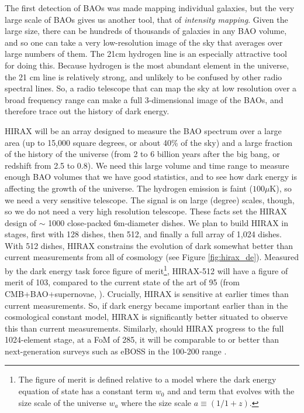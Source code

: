 \documentclass[letterpaper,11pt,preprint]{aastex}
\begin{document}
The first detection of BAOs \citep{Eisenstein05} was made mapping
individual galaxies, but the very large scale of BAOs gives us another
tool, that of {\textit{intensity mapping}}.  Given the large size,
there can be hundreds of thousands of galaxies in any BAO volume, and
so one can take a very low-resolution image of the sky that averages
over large numbers of them.  The 21cm hydrogen line is an especially
attractive tool for doing this.  Because hydrogen is the most abundant
element in the universe, the 21 cm line is relatively strong, and
unlikely to be confused by other radio spectral lines.  So, a radio
telescope that can map the sky at low resolution over a broad
frequency range can make a full 3-dimensional image of the BAOs, and
therefore trace out the history of dark energy.

HIRAX will be an array designed to measure the BAO spectrum over a
large area (up to 15,000 square degrees, or about 40\% of the sky) and
a large fraction of the history of the universe (from 2 to 6 billion
years after the big bang, or redshift from 2.5 to 0.8).  We need this
large volume and time range to measure enough BAO volumes that we have
good statistics, and to see how dark energy is affecting the growth of
the universe.  The hydrogen emission is faint ($100 \mu \mathrm{K}$),
so we need a very sensitive telescope.  The signal is on large
(degree) scales, though, so we do not need a very high resolution
telescope.  These facts set the HIRAX design of $\sim$ 1000
close-packed 6m-diameter dishes.  We plan to build HIRAX in stages,
first with 128 dishes, then 512, and finally a full array of 1,024
dishes.  With 512 dishes, HIRAX constrains the evolution of dark
somewhat better than current measurements from all of cosmology (see
Figure \ref{fig:hirax_de}).  Measured by the dark energy task force
figure of merit\footnote{The figure of merit is defined relative to a
  model where the dark energy equation of state has a constant term
  $w_0$ and and term that evolves with the size scale of the universe
  $w_a$ where the size scale $a\equiv(1/1+z)$.}, HIRAX-512 will have a
figure of merit of 103, compared to the current state of the art of 95
(from CMB+BAO+supernovae, \citet{Planck2018Params}).  Crucially, HIRAX
is sensitive at earlier times than current measurements. So, if dark
energy became important earlier than in the cosmological constant
model, HIRAX is significantly better situated to observe this than
current measurements.  Similarly, should HIRAX progress to the full
1024-element stage, at a FoM of 285, it will be comparable to or better than
next-generation surveys such as eBOSS in the 100-200 range
\citep{Zhao2016}.
\end{document}
